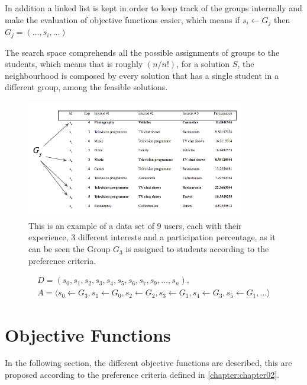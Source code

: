 In addition a linked list is kept in order to keep track of the groups internally and make the evaluation of objective functions easier, which means if $s_i \leftarrow G_j$ then $G_j = (...,s_i,...)$

The search space comprehends all the possible assignments of groups to the students, which means that is roughly $(n/n!)$, for a solution $S$, the neighbourhood is composed by every solution that has a single student in a different group, among the feasible solutions.

\begin{figure}
    \caption{This is an example of a data set of 9 users, each with their experience, 3 different interests and a participation percentage, as it can be seen the Group $G_3$ is assigned to students according to the preference criteria.}
    \label{dataset_eg}
    \includegraphics[width=0.85\textwidth]{images/dataset_eg.png}
\end{figure}

\begin{equation*}
  \label{eq:students_groups}
  \begin{gathered}
        D = (s_0,s_1,s_2,s_3,s_4,s_5,s_6,s_7,s_9,...,s_n),\\
        A = \langle s_0 \leftarrow G_3, s_1 \leftarrow G_0, s_2 \leftarrow G_2,     s_3 \leftarrow G_1, s_4 \leftarrow G_3, s_5 \leftarrow G_1,...  \rangle
  \end{gathered}
\end{equation*}

\section{Objective Functions}

In the following section, the different objective functions are described, this are proposed according to the preference criteria defined in \ref{chapter:chapter02}.


